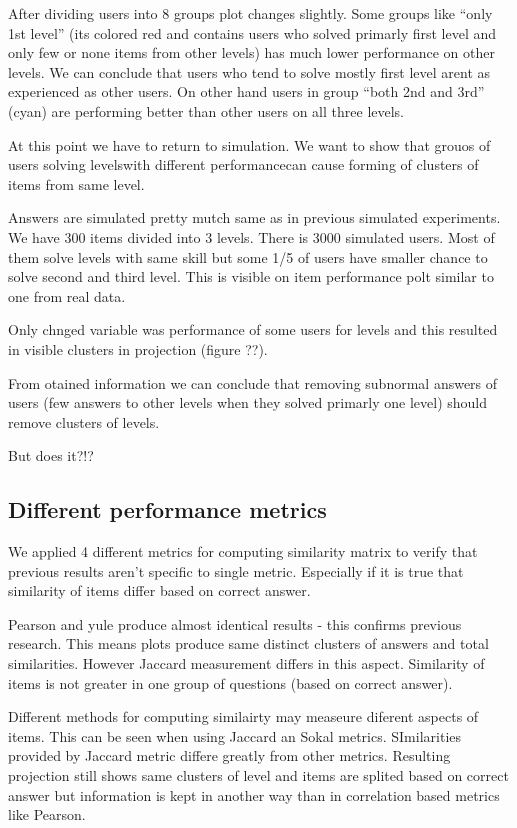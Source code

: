 \documentclass[
  digital, %
  table,   %
  nolof,     %
  nolot,     %
  nocover
]{fithesis3}
\begin{document}
After dividing users into 8 groups plot changes slightly. Some groups
like ``only 1st level'' (its colored red and contains users who solved
primarly first level and only few or none items from other levels) has
much lower performance on other levels. We can conclude that users who
tend to solve mostly first level arent as experienced as other users. On
other hand users in group ``both 2nd and 3rd'' (cyan) are performing
better than other users on all three levels.

At this point we have to return to simulation. We want to show that
grouos of users solving levelswith different performancecan cause
forming of clusters of items from same level.

Answers are simulated pretty mutch same as in previous simulated
experiments. We have 300 items divided into 3 levels. There is 3000
simulated users. Most of them solve levels with same skill but some 1/5
of users have smaller chance to solve second and third level. This is
visible on item performance polt similar to one from real data.

Only chnged variable was performance of some users for levels and this
resulted in visible clusters in projection (figure ??).

From otained information we can conclude that removing subnormal answers
of users (few answers to other levels when they solved primarly one
level) should remove clusters of levels.

But does it?!?

\subsection{Different performance
metrics}\label{different-performance-metrics}


We applied 4 different metrics for computing similarity matrix to verify
that previous results aren't specific to single metric. Especially if it
is true that similarity of items differ based on correct answer.


Pearson and yule produce almost identical results - this confirms
previous research. This means plots produce same distinct clusters of
answers and total similarities. However Jaccard measurement differs in
this aspect. Similarity of items is not greater in one group of
questions (based on correct answer).

Different methods for computing similairty may measeure diferent aspects
of items. This can be seen when using Jaccard an Sokal metrics.
SImilarities provided by Jaccard metric differe greatly from other
metrics. Resulting projection still shows same clusters of level and
items are splited based on correct answer but information is kept in
another way than in correlation based metrics like Pearson.
\end{document}
